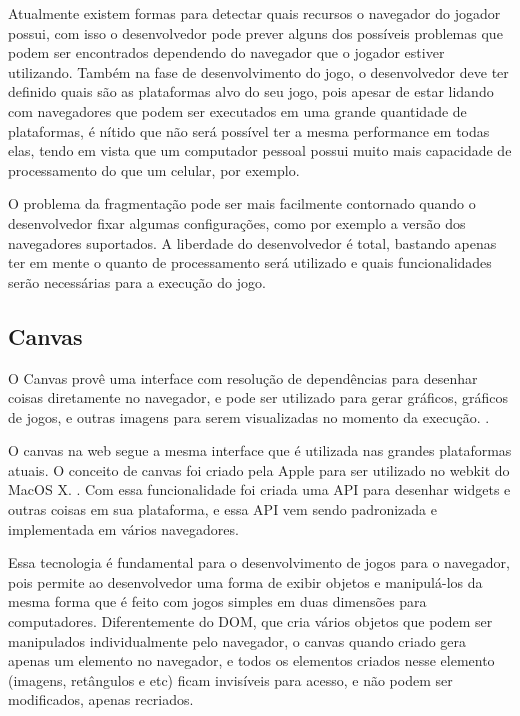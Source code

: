 Atualmente existem formas para detectar quais recursos o navegador do
jogador possui, com isso o desenvolvedor pode prever alguns dos
possíveis problemas que podem ser encontrados dependendo do navegador
que o jogador estiver utilizando. Também na fase de desenvolvimento
do jogo, o desenvolvedor deve ter
definido quais são as plataformas alvo do seu jogo, pois apesar de
estar lidando com navegadores que podem ser executados em uma grande
quantidade de plataformas, é nítido que não será possível ter a mesma
performance em todas elas, tendo em vista que um computador pessoal
possui muito mais capacidade de processamento do que um celular, por
exemplo.

O problema da fragmentação pode ser mais facilmente contornado quando
o desenvolvedor fixar algumas configurações, como por exemplo a versão
dos navegadores suportados. A liberdade do desenvolvedor é total,
bastando apenas ter em mente o quanto de processamento será utilizado
e quais funcionalidades serão necessárias para a execução do jogo.

\subsection{Canvas}

O Canvas provê uma interface com resolução de dependências para
desenhar coisas diretamente no navegador, e pode ser utilizado para
gerar gráficos, gráficos de jogos, e outras imagens para serem
visualizadas no momento da execução. \cite{website:w3ccanvas}.

O canvas na web segue a mesma interface que é utilizada nas grandes
plataformas atuais. O conceito de canvas foi criado pela Apple para
ser utilizado no webkit do MacOS X. \cite{lubbers2010pro}. Com essa
funcionalidade foi criada uma API
para desenhar widgets e outras coisas em sua plataforma, e essa API
vem sendo padronizada e implementada em vários navegadores.

Essa tecnologia é fundamental para o desenvolvimento de jogos para
o navegador, pois permite ao desenvolvedor uma forma de exibir
objetos e manipulá-los da mesma forma que é feito com jogos
simples em duas dimensões para computadores.
Diferentemente do DOM, que cria vários objetos que podem ser
manipulados individualmente pelo navegador, o canvas quando criado
gera apenas um elemento no navegador, e todos os elementos criados
nesse elemento (imagens, retângulos e etc) ficam invisíveis para acesso, e
não podem ser modificados, apenas recriados.

